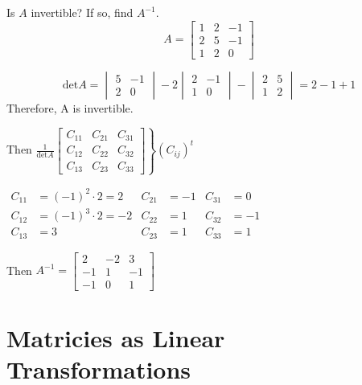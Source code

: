 \documentclass[../main.tex]{subfiles}
\begin{document}
\begin{example}
    Is \( A \) invertible? If so, find \( A^{-1} \).
    \[ A = \begin{bmatrix}
        1 & 2 & -1 \\
        2 & 5 & -1 \\
        1 & 2 & 0
    \end{bmatrix} \]

    \[ \text{det}A = \begin{vmatrix}
        5 & -1 \\
        2 & 0
    \end{vmatrix}
    -2 \begin{vmatrix}
        2 & -1 \\
        1 & 0
    \end{vmatrix}
    - \begin{vmatrix}
        2 & 5 \\
        1 & 2
    \end{vmatrix}
    = 2-1+1 \]
    Therefore, A is invertible.

    Then \( \left. \displaystyle \frac{1}{\text{det}A}
    \begin{bmatrix}
        C_{11} & C_{21} & C_{31} \\
        C_{12} & C_{22} & C_{32} \\
        C_{13} & C_{23} & C_{33}
    \end{bmatrix} \right\} (C_{ij})^t \)

    \( \begin{aligned}
        C_{11} &= (-1)^2 \cdot 2 = 2 & C_{21} &= -1 & C_{31} &= 0 \\
        C_{12} &= (-1)^3 \cdot 2 = -2 & C_{22} &= 1 & C_{32} &= -1 \\
        C_{13} &= 3 & C_{23} &= 1 & C_{33} &= 1
    \end{aligned} \)

    Then \( A^{-1} = \begin{bmatrix}
        2 & -2 & 3 \\
        -1 & 1 & -1 \\
        -1 & 0 & 1
    \end{bmatrix} \)
\end{example}


\section{Matricies as Linear Transformations}
\end{document}
